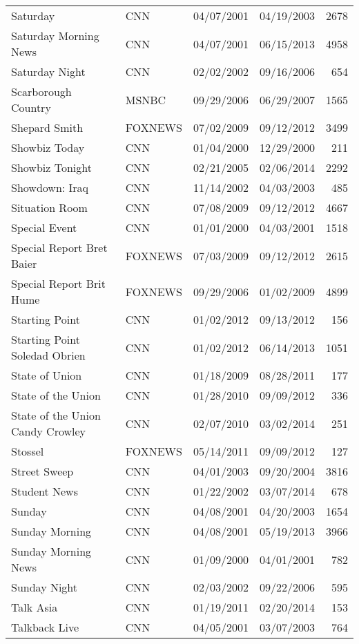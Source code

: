{\begin{longtable}{llllr}
  Saturday & CNN & 04/07/2001 & 04/19/2003 & 2678 \\ 
  Saturday Morning News & CNN & 04/07/2001 & 06/15/2013 & 4958 \\ 
  Saturday Night & CNN & 02/02/2002 & 09/16/2006 & 654 \\ 
  Scarborough Country & MSNBC & 09/29/2006 & 06/29/2007 & 1565 \\ 
  Shepard Smith & FOXNEWS & 07/02/2009 & 09/12/2012 & 3499 \\ 
  Showbiz Today & CNN & 01/04/2000 & 12/29/2000 & 211 \\ 
  Showbiz Tonight & CNN & 02/21/2005 & 02/06/2014 & 2292 \\ 
  Showdown: Iraq & CNN & 11/14/2002 & 04/03/2003 & 485 \\ 
  Situation Room & CNN & 07/08/2009 & 09/12/2012 & 4667 \\ 
  Special Event & CNN & 01/01/2000 & 04/03/2001 & 1518 \\ 
  Special Report Bret Baier & FOXNEWS & 07/03/2009 & 09/12/2012 & 2615 \\ 
  Special Report Brit Hume & FOXNEWS & 09/29/2006 & 01/02/2009 & 4899 \\ 
  Starting Point & CNN & 01/02/2012 & 09/13/2012 & 156 \\ 
  Starting Point Soledad Obrien & CNN & 01/02/2012 & 06/14/2013 & 1051 \\ 
  State of Union & CNN & 01/18/2009 & 08/28/2011 & 177 \\ 
  State of the Union & CNN & 01/28/2010 & 09/09/2012 & 336 \\ 
  State of the Union Candy Crowley & CNN & 02/07/2010 & 03/02/2014 & 251 \\ 
  Stossel & FOXNEWS & 05/14/2011 & 09/09/2012 & 127 \\ 
  Street Sweep & CNN & 04/01/2003 & 09/20/2004 & 3816 \\ 
  Student News & CNN & 01/22/2002 & 03/07/2014 & 678 \\ 
  Sunday & CNN & 04/08/2001 & 04/20/2003 & 1654 \\ 
  Sunday Morning & CNN & 04/08/2001 & 05/19/2013 & 3966 \\ 
  Sunday Morning News & CNN & 01/09/2000 & 04/01/2001 & 782 \\ 
  Sunday Night & CNN & 02/03/2002 & 09/22/2006 & 595 \\ 
  Talk Asia & CNN & 01/19/2011 & 02/20/2014 & 153 \\ 
  Talkback Live & CNN & 04/05/2001 & 03/07/2003 & 764 \\ 

\end{longtable}}
